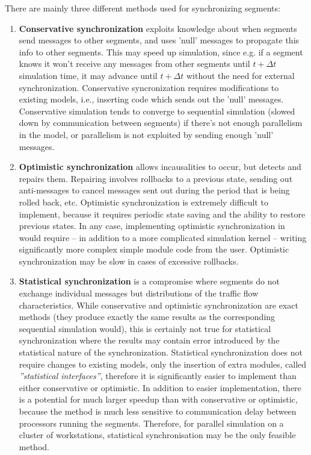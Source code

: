 There are mainly three different methods used for synchronizing 
segments:
\begin{enumerate}
  \item{\textbf{Conservative synchronization} exploits knowledge about when segments send
    messages to other segments, and uses 'null' messages to propagate
    this info to other segments. This may speed up simulation, since
    e.g. if a segment knows it won't receive any messages from other
    segments until $t+\Delta t$ simulation time, it may advance until
    $t+\Delta t$ without the need for external synchronization.
    Conservative syncronization requires modifications to existing
    models, i.e., inserting code which sends out the 'null' messages.
    Conservative simulation tends to converge to sequential simulation
    (slowed down by communication between segments) if there's not
    enough parallelism in the model, or parallelism is not exploited
    by sending enough 'null' messages.}
  
  \item{\textbf{Optimistic synchronization} allows incausalities to occur, but detects and
    repairs them. Repairing involves rollbacks to a previous state,
    sending out anti-messages to cancel messages sent out during the
    period that is being rolled back, etc.  Optimistic synchronization
    is extremely difficult to implement, because it requires periodic
    state saving and the ability to restore previous states. In any
    case, implementing optimistic synchronization in {\opp} would
    require -- in addition to a more complicated simulation kernel --
    writing significantly more complex simple
    module code from the user.  Optimistic synchronization may be slow
    in cases of excessive rollbacks.}
  
  \item{\textbf{Statistical synchronization} is a compromise where segments do not exchange
    individual messages but distributions of the traffic flow
    characteristics. While conservative and optimistic synchronization
    are exact methods (they produce exactly the same results as the
    corresponding sequential simulation would), this is certainly not
    true for statistical synchronization where the results may contain
    error introduced by the statistical nature of the synchronization.
    Statistical synchronization does not require changes to existing
    models, only the insertion of extra modules, called
    \textit{''statistical interfaces''}, therefore it is significantly
    easier to implement than either conservative or optimistic. In
    addition to easier implementation, there is a potential for much
    larger speedup than with conservative or optimistic, because the
    method is much less sensitive to communication delay between
    processors running the segments. Therefore, for parallel
    simulation on a cluster of workstations, statistical
    synchronisation may be the only feasible method.}
\end{enumerate}






